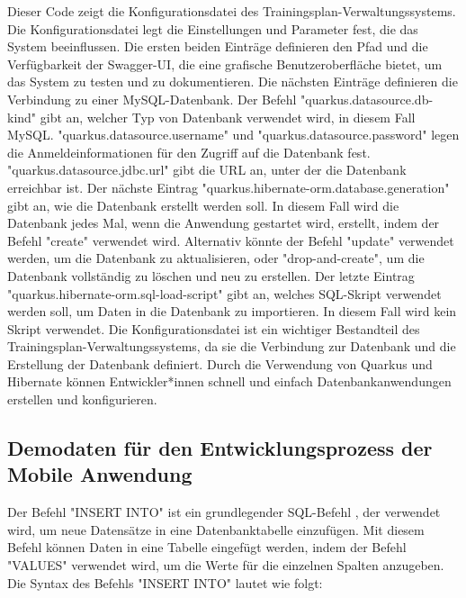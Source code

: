 Dieser Code zeigt die Konfigurationsdatei \cite{QuarkusHibernateORM} des Trainingsplan-Verwaltungssystems. Die Konfigurationsdatei legt die Einstellungen und Parameter fest, die das System beeinflussen. Die ersten beiden Einträge definieren den Pfad und die Verfügbarkeit der Swagger-UI, die eine grafische Benutzeroberfläche bietet, um das System zu testen und zu dokumentieren.
\newline
\newline
Die nächsten Einträge definieren die Verbindung zu einer MySQL-Datenbank. Der Befehl "quarkus.datasource.db-kind" gibt an, welcher Typ von Datenbank verwendet wird, in diesem Fall MySQL. "quarkus.datasource.username" und "quarkus.datasource.password" legen die Anmeldeinformationen für den Zugriff auf die Datenbank fest. "quarkus.datasource.jdbc.url" gibt die URL an, unter der die Datenbank erreichbar ist.
\newline
\newline
Der nächste Eintrag "quarkus.hibernate-orm.database.generation" gibt an, wie die Datenbank erstellt werden soll. In diesem Fall wird die Datenbank jedes Mal, wenn die Anwendung gestartet wird, erstellt, indem der Befehl "create" verwendet wird. Alternativ könnte der Befehl "update" verwendet werden, um die Datenbank zu aktualisieren, oder "drop-and-create", um die Datenbank vollständig zu löschen und neu zu erstellen.
\newline
\newline
Der letzte Eintrag "quarkus.hibernate-orm.sql-load-script" gibt an, welches SQL-Skript verwendet werden soll, um Daten in die Datenbank zu importieren. In diesem Fall wird kein Skript verwendet.
\newline
\newline
Die Konfigurationsdatei ist ein wichtiger Bestandteil des Trainingsplan-Verwaltungssystems, da sie die Verbindung zur Datenbank und die Erstellung der Datenbank definiert. Durch die Verwendung von Quarkus und Hibernate können Entwickler*innen schnell und einfach Datenbankanwendungen erstellen und konfigurieren.

\subsection{Demodaten für den Entwicklungsprozess der Mobile Anwendung}

Der Befehl "INSERT INTO" ist ein grundlegender SQL-Befehl \cite{SQLInsert}, der verwendet wird, um neue Datensätze in eine Datenbanktabelle einzufügen. Mit diesem Befehl können Daten in eine Tabelle eingefügt werden, indem der Befehl "VALUES" verwendet wird, um die Werte für die einzelnen Spalten anzugeben.
\newline
\newline
Die Syntax des Befehls "INSERT INTO" lautet wie folgt:

